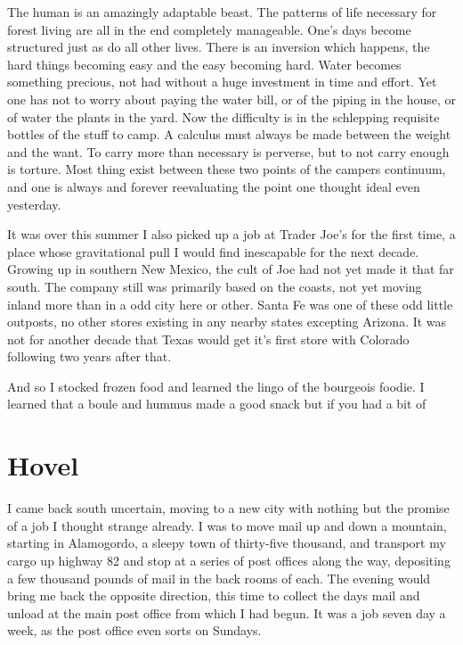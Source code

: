 \documentclass[ebook, 10pt, openright, onecolumn]{memoir}
\newcommand*\td[1]{
  \todo[inline]{
     #1 
  }
}
\newcommand*\finish{\td{ ----- Finish this section -----}}
\begin{document}
The human is an amazingly adaptable beast.  The patterns of life necessary for
forest living are all in the end completely manageable.  One's days become
structured just as do all other lives.  There is an inversion which happens, the
hard things becoming easy and the easy becoming hard.  Water becomes something
precious, not had without a huge investment in time and effort.  Yet one has not
to worry about paying the water bill, or of the piping in the house, or of water
the plants in the yard.  Now the difficulty is in the schlepping requisite
bottles of the stuff to camp.  A calculus must always be made between the weight
and the want.  To carry more than necessary is perverse, but to not carry enough
is torture.  Most thing exist between these two points of the campers continuum,
and one is always and forever reevaluating the point one thought ideal even
yesterday.
\finish


It was over this summer I also picked up a job at Trader Joe's for the first
time, a place whose gravitational pull I would find inescapable for the next
decade.  Growing up in southern New Mexico, the cult of Joe had not yet made it
that far south.  The company still was primarily based on the coasts, not yet
moving inland more than in a odd city here or other. Santa Fe was one of these
odd little outposts, no other stores existing in any nearby states excepting
Arizona.  It was not for another decade that Texas  would get it's first
store with Colorado following two years after that.

\finish

And so I stocked frozen food and learned the lingo of the bourgeois foodie. I
learned that a boule and hummus made a good snack but if you had a bit of

\chapter{Hovel}
\label{cha:hovel}

I came back south uncertain, moving to a new city with nothing but the promise
of a job I thought strange already.  I was to move mail up and down a mountain,
starting in Alamogordo, a sleepy town of thirty-five thousand, and transport
my cargo up highway 82 and stop at a series of post offices along the way,
depositing a few thousand pounds of mail in the back rooms of each.  The evening
would bring me back the opposite direction, this time to collect the days mail
and unload at the main post office from which I had begun.  It was a job seven
day a week, as the post office even sorts on Sundays.
\end{document}
